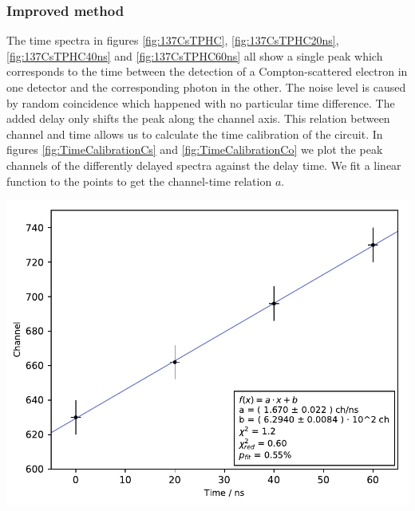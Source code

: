 \subsubsection{Improved method}
%
The time spectra in figures \ref{fig:137CsTPHC}, \ref{fig:137CsTPHC20ns}, \ref{fig:137CsTPHC40ns} and \ref{fig:137CsTPHC60ns} all show a single peak which corresponds to the time between the detection of a Compton-scattered electron in one detector and the corresponding photon in the other.
The noise level is caused by random coincidence which happened with no particular time difference.
The added delay only shifts the peak along the channel axis.
This relation between channel and time allows us to calculate the time calibration of the circuit.
In figures \ref{fig:TimeCalibrationCs} and \ref{fig:TimeCalibrationCo} we plot the peak channels of the differently delayed spectra against the delay time.
We fit a linear function to the points to get the channel-time relation $a$.
%
\par
%
\minipage{\linewidth}
    \begin{center}
        \captionsetup{type=figure}
        \begin{adjustbox}{max width=\linewidth, keepaspectratio}
            \includegraphics[]{pdf/time_calibration-cs}
        \end{adjustbox}
        \label{fig:TimeCalibrationCs}
    \end{center}
\endminipage
%
\par
%
\minipage{\linewidth}
